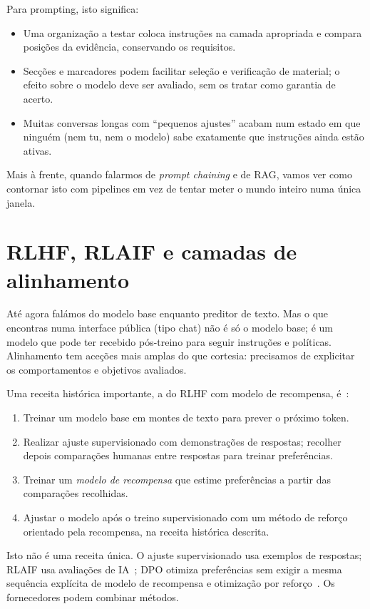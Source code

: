 Para prompting, isto significa:

\begin{itemize}[leftmargin=*]
\item Uma organização a testar coloca instruções na camada apropriada e compara posições da evidência, conservando os requisitos.
\item Secções e marcadores podem facilitar seleção e verificação de material; o efeito sobre o modelo deve ser avaliado, sem os tratar como garantia de acerto.
\item Muitas conversas longas com “pequenos ajustes” acabam num estado em que ninguém (nem tu, nem o modelo) sabe exatamente que instruções ainda estão ativas.
\end{itemize}

Mais à frente, quando falarmos de \emph{prompt chaining} e de RAG, vamos ver como contornar isto com pipelines em vez de tentar meter o mundo inteiro numa única janela.

\section{RLHF, RLAIF e camadas de alinhamento}

Até agora falámos do modelo base enquanto preditor de texto. Mas o que encontras numa interface pública (tipo chat) não é só o modelo base; é um modelo que pode ter recebido pós-treino para seguir instruções e políticas. Alinhamento tem aceções mais amplas do que cortesia: precisamos de explicitar os comportamentos e objetivos avaliados.

Uma receita histórica importante, a do RLHF com modelo de recompensa, é~\citep{ouyang2022}:

\begin{enumerate}[leftmargin=*]
\item Treinar um modelo base em montes de texto para prever o próximo token.
\item Realizar ajuste supervisionado com demonstrações de respostas; recolher depois comparações humanas entre respostas para treinar preferências.
\item Treinar um \emph{modelo de recompensa} que estime preferências a partir das comparações recolhidas.
\item Ajustar o modelo após o treino supervisionado com um método de reforço orientado pela recompensa, na receita histórica descrita.
\end{enumerate}

Isto não é uma receita única. O ajuste supervisionado usa exemplos de respostas; RLAIF usa avaliações de IA~\citep{bai2022}; DPO otimiza preferências sem exigir a mesma sequência explícita de modelo de recompensa e otimização por reforço~\citep{rafailov2023}. Os fornecedores podem combinar métodos.

